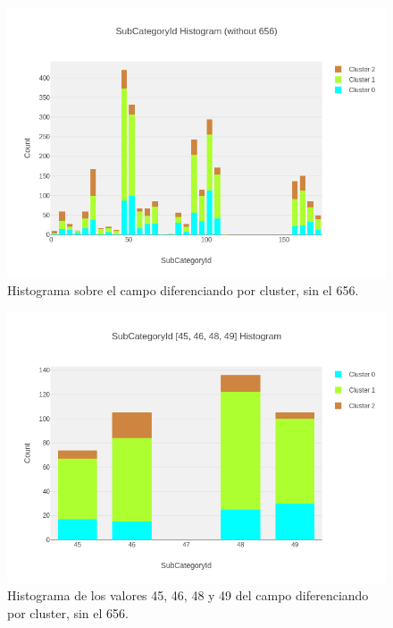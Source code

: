 \newpage
\begin{figure}[!th]
\includegraphics[scale=0.5]{figures/histogram-subcategoryid-per-cluster-without656}
\centering
\caption{Histograma sobre el campo  diferenciando por cluster, sin el  656.}
\label{fig:histogram-subcategoryid-per-cluster-without656}
\end{figure}

\begin{figure}[!th]
\includegraphics[scale=0.5]{figures/histogram-subcategoryid-45-49}
\centering
\caption{Histograma de los valores 45, 46, 48 y 49 del campo  diferenciando por cluster, sin el  656.}
\label{fig:histogram-subcategoryid-45-49}
\end{figure}




